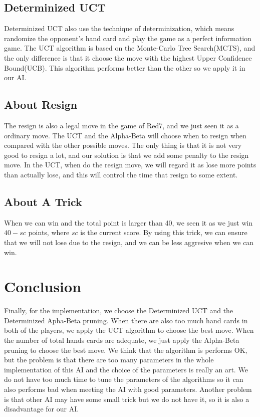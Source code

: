 \documentclass{article}
\begin{document}
\subsection{Determinized UCT}
Determinized UCT also use the technique of determinization, which means randomize the opponent's hand card and play the game as a perfect information game. The UCT algorithm is based on the Monte-Carlo Tree Search(MCTS), and the only difference is that it choose the move with the highest Upper Confidence Bound(UCB). This algorithm performs better than the other so we apply it in our AI.

\subsection{About Resign}
The resign is also a legal move in the game of Red7, and we just seen it as a ordinary move. The UCT and the Alpha-Beta will choose when to resign when compared with the other possible moves. The only thing is that it is not very good to resign a lot, and our solution is that we add some penalty to the resign move. In the UCT, when do the resign move, we will regard it as lose more points than actually lose, and this will control the time that resign to some extent.

\subsection{About A Trick}
When we can win and the total point is larger than 40, we seen it as we just win $40 - sc$ points, where $sc$ is the current score. By using this trick, we can ensure that we will not lose due to the resign, and we can be less aggresive when we can win.

\section{Conclusion}
Finally, for the implementation, we choose the Determinized UCT and the Determinized Apha-Beta pruning. When there are also too much hand cards in both of the players, we apply the UCT algorithm to choose the best move. When the number of total hands cards are adequate, we just apply the Alpha-Beta pruning to choose the best move. We think that the algorithm is performs OK, but the problem is that there are too many parameters in the whole implementation of this AI and the choice of the parameters is really an art. We do not have too much time to tune the parameters of the algorithms so it can also performs bad when meeting the AI with good parameters. Another problem is that other AI may have some small trick but we do not have it, so it is also a disadvantage for our AI.
\end{document}
